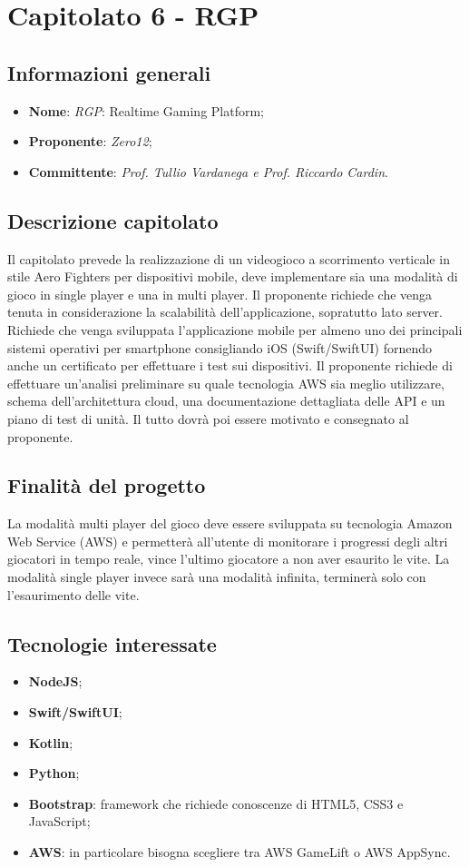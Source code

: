 \section{Capitolato 6 - RGP}
\subsection{Informazioni generali}
\begin{itemize}
    \item \textbf{Nome}: \emph{RGP}: Realtime Gaming Platform;
    \item \textbf{Proponente}: \emph{Zero12};
    \item \textbf{Committente}: \emph{Prof. Tullio Vardanega e Prof. Riccardo Cardin}.
\end{itemize}
\subsection{Descrizione capitolato}
Il capitolato prevede la realizzazione di un videogioco a scorrimento verticale in stile Aero Fighters per dispositivi mobile, deve implementare sia una modalità di gioco in single player e una in multi player.
Il proponente richiede che venga tenuta in considerazione la scalabilità dell'applicazione, sopratutto lato server.
Richiede che venga sviluppata l'applicazione mobile per almeno uno dei principali sistemi operativi per smartphone consigliando iOS (Swift/SwiftUI) fornendo anche un certificato per effettuare i test sui dispositivi.
Il proponente richiede di effettuare un'analisi preliminare su quale tecnologia AWS sia meglio utilizzare, schema dell'architettura cloud, una documentazione dettagliata delle API e un piano di test di unità. Il tutto dovrà poi essere motivato e consegnato al proponente.
\subsection{Finalità del progetto}
La modalità multi player del gioco deve essere sviluppata su tecnologia Amazon Web Service (AWS) e permetterà all'utente di monitorare i progressi degli altri giocatori in tempo reale, vince l'ultimo giocatore a non aver esaurito le vite. 
La modalità single player invece sarà una modalità infinita, terminerà solo con l'esaurimento delle vite.
\subsection{Tecnologie interessate}
\begin{itemize}
    \item \textbf{NodeJS};
	\item \textbf{Swift/SwiftUI};
	\item \textbf{Kotlin};
	\item \textbf{Python};
	\item \textbf{Bootstrap}: framework che richiede conoscenze di HTML5, CSS3 e JavaScript;
	\item \textbf{AWS}: in particolare bisogna scegliere tra AWS GameLift o AWS AppSync.
\end{itemize}
